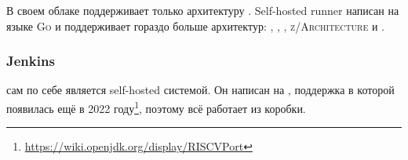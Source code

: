 В своем облаке \gitlab{} поддерживает только архитектуру \amd{}.
Self-hosted runner написан на языке \textsc{Go} и поддерживает гораздо больше архитектур: \amd{}, \arm{}, \power{}, \textsc{z/Architecture} и \riscv{}.

\subsubsection{Jenkins}

\jenkins{} сам по себе является self-hosted \ci{} системой.
Он написан на \java{}, поддержка \riscv{} в которой появилась ещё в 2022 году\footnote{\url{https://wiki.openjdk.org/display/RISCVPort}}, поэтому всё работает из коробки.
